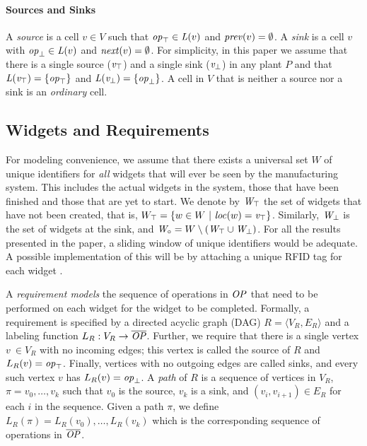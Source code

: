 \paragraph*{Sources and Sinks}
 A {\em source \/} is a cell $v \in V$ such that $\mathit{op}_\top \in \mathit{L}{(v)}$ and $\mathit{prev}(v) = \emptyset$.
A  {\em sink\/} is a cell $v$ with $\mathit{op}_\bot \in \mathit{L}{(v)}$ and ${\mathit{next}}(v) = \emptyset$.  
 For simplicity, in this paper we assume that there is a single source ($\mathit{v}_\top$) and a single sink ($\mathit{v}_\bot$)  in any plant $P$ and 
 that $ \mathit{L}{(\mathit{v}_\top)} = \{\mathit{op}_\top\}$ and $\mathit{L}{(\mathit{v}_\bot)} = \{\mathit{op}_\bot\}$. 
A cell in $V$ that is neither a source nor a sink is an {\em ordinary\/} cell. 

	

\subsection{Widgets and Requirements}
For modeling convenience, we assume that there exists a universal set  $W$ of unique identifiers for {\em all} widgets that will ever be seen by the manufacturing system.
% 
This includes the actual widgets in the system, those that have been finished and those that are yet to start. We denote by $\mathit{W}_\top$ the set of widgets that have not been created, that is, $W_\top = \{w \in W \ | \ \mathit{loc}(w) = \mathit{v}_\top \}$. Similarly, $\mathit{W}_\bot$ is the set of widgets at the sink, and  $\mathit{W}_\circ = W \setminus (\mathit{W}_\top \cup \mathit{W}_\bot)$.
For all the results presented in the paper, a sliding window of unique identifiers would be adequate. 
A possible implementation of this will be by attaching a unique RFID tag for each widget \cite{huang2008rfid}. 

A \emph{requirement models} the sequence of operations in $\mathit{OP}$ that need to be performed on each widget for the widget to be completed. Formally, a requirement is specified by a directed acyclic graph (DAG) $R = \langle V_R, E_R \rangle$ and a labeling function $L_R:V_R\rightarrow {\overline{\mathit{OP}}}$.  Further, we require that there is a single vertex $v\ \in V_R$ with no incoming edges; this vertex is called the source of $R$ and $L_R(v) = \mathit{op}_\top$. Finally, vertices with  no outgoing edges are called sinks, and every such vertex $v$ has $L_R(v) = \mathit{op}_\bot$.
A {\em path\/} of $R$ is a sequence of vertices in $V_R$, $\pi = v_0,\ldots,v_k$ such that $v_0$ is the source, $v_k$ is a sink, and $(v_i,v_{i+1})\in E_R$ for each $i$ in the sequence. Given a path $\pi$, we define $L_R(\pi) =  L_R(v_0),\ldots,L_R(v_k)$ which is the corresponding sequence of operations in ${\overline{\mathit{OP}}}$.


